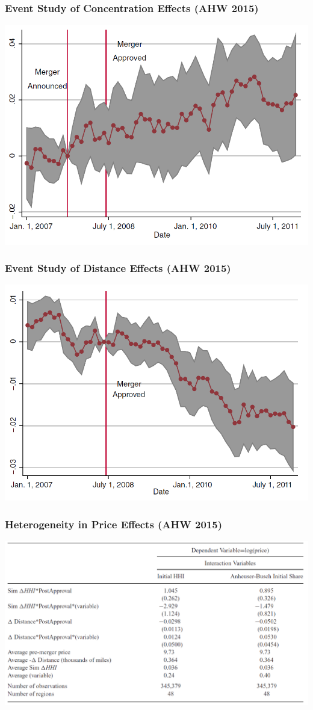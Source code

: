 \documentclass{beamer}
\begin{document}
\begin{frame}\frametitle{Event Study of Concentration Effects (AHW 2015)}
    \centering
    \includegraphics[width=0.95\linewidth]{ahw_fig_5}
\end{frame} 

\begin{frame}\frametitle{Event Study of Distance Effects (AHW 2015)}
    \centering
    \includegraphics[width=0.95\linewidth]{ahw_fig_6}
\end{frame} 

\begin{frame}\frametitle{Heterogeneity in Price Effects (AHW 2015)}
    \centering
    \includegraphics[width=0.95\linewidth]{ahw_table_6}
\end{frame} 
\end{document}
